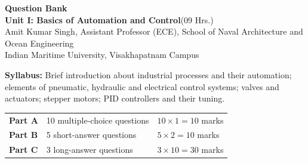 \documentclass[11pt,a4paper]{article}
\begin{document}
	\begin{center}
		{\Large\bfseries\color{cAccent} Question Bank}\\[4pt]
		{\large\bfseries Unit I: Basics of Automation and Control}\quad(09 Hrs.)\\[6pt]
		{\small Amit Kumar Singh, Assistant Professor (ECE), School of Naval Architecture and Ocean Engineering\\
			Indian Maritime University, Visakhapatnam Campus}
	\end{center}

	\noindent\textbf{Syllabus:} Brief introduction about industrial processes and their automation; elements of pneumatic, hydraulic and electrical control systems; valves and actuators; stepper motors; PID controllers and their tuning.

	\medskip
	\noindent
	\begin{tabular}{@{}lll@{}}
		\textbf{Part A} & 10 multiple-choice questions & $10\times1 = 10$ marks \\
		\textbf{Part B} & 5 short-answer questions      & $5\times2 = 10$ marks \\
		\textbf{Part C} & 3 long-answer questions       & $3\times10 = 30$ marks \\
	\end{tabular}
\end{document}
